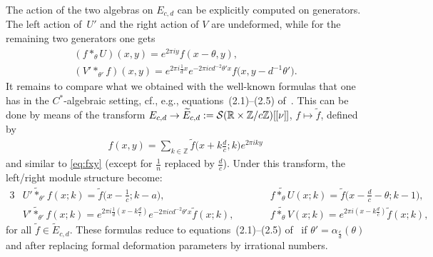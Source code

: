 \documentclass[pdftex]{sigma}
\numberwithin{equation}{section}
\theoremstyle{definition}
\newcommand{\R}{\mathbb{R}}
\newcommand{\Z}{\mathbb{Z}}
\newcommand{\mc}{\mathcal}
\newcommand{\lbrak}{[\hspace{-0.5pt}[}
\newcommand{\rbrak}{]\hspace{-0.5pt}]}
\renewcommand{\hbar}{\nu}
\begin{document}
The action of the two algebras on $E_{c,d}$ can be explicitly computed on generators.
The left action of~$U'$ and the right action of $V$ are undeformed, while for the remaining two generators one gets
\begin{gather*}
(f\ast_\theta U)(x,y) =e^{2\pi iy}f(x-\theta,y) , \\
(V'\ast_{\theta'} f)(x,y) =e^{2\pi i\frac{1}{d}x}e^{-2\pi icd^{-2}\theta'x}f\big(x,y-d^{-1}\theta'\big) .
\end{gather*}
It remains to compare what we obtained with the well-known formulas that one has in the $C^*$-algebraic setting, cf., e.g., equations~(2.1)--(2.5) of~\cite{Pla06}.
This can be done by means of the transform
$E_{c,d}\to\widetilde{E}_{c,d}:=\mc{S}(\R\times\Z/c\Z)\lbrak\hbar\rbrak$, $f\mapsto\widetilde{f}$, def\/ined by
\begin{gather*}
f(x,y)=\sum_{k\in\Z}\widetilde{f}\big(x+k\tfrac{d}{c};k\big)e^{2\pi iky}
\end{gather*}
and similar to \eqref{eq:fxy} (except for $\frac{1}{n}$ replaced by $\frac{d}{c}$).
Under this transform, the left/right module structure become:
\begin{alignat*}{3}
& \widetilde{U'\!\ast_{\theta'}\! f}(x;k) =\widetilde{f}\big(x-\tfrac{1}{c};k-a\big) ,\qquad &&
\widetilde{f\!\ast_\theta\! U}(x;k) =\widetilde{f}\big(x-\tfrac{d}{c}-\theta;k-1\big) , & \\
& \widetilde{V'\!\ast_{\theta'}\! f}(x;k) =e^{2\pi i\frac{1}{d}(x-k\frac{d}{c})}e^{-2\pi icd^{-2}\theta'x}\widetilde{f}(x;k) , \qquad &&
\widetilde{f\!\ast_\theta\! V}(x;k) =e^{2\pi i(x-k\frac{d}{c})}\widetilde{f}(x;k) ,&
\end{alignat*}
for all $\widetilde{f}\in\widetilde{E}_{c,d}$. These formulas reduce to
equations~(2.1)--(2.5) of~\cite{Pla06} if $\theta'=\alpha_{\frac{c}{d}}(\theta)$ and
after replacing formal deformation parameters by irrational numbers.
\end{document}
